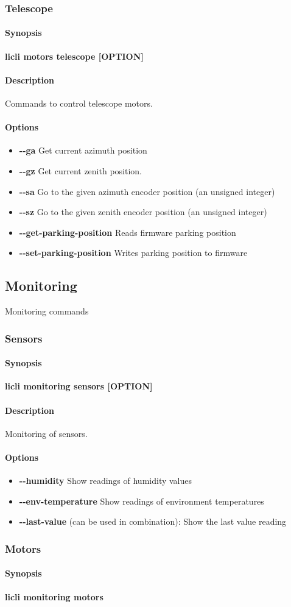 \documentclass[letterpaper, 10 pt]{article}
\newcommand{\cmdsection}[1]{\paragraph{#1}\mbox{}\par}
\begin{document}
\subsubsection{Telescope}
\cmdsection{Synopsis} \textbf{licli motors telescope [OPTION]}\\

\cmdsection{Description} Commands to control telescope motors. \\
\cmdsection{Options}
\begin{itemize}
	\item[] \textbf{-{}-ga} Get current azimuth position
	\item[] \textbf{-{}-gz} Get current zenith position.
	\item[] \textbf{-{}-sa} Go to the given azimuth encoder position (an unsigned integer)
	\item[] \textbf{-{}-sz} Go to the given zenith encoder position (an unsigned integer)
	\item[] \textbf{-{}-get-parking-position} Reads firmware parking position
	\item[] \textbf{-{}-set-parking-position} Writes parking position to firmware
\end{itemize}
\subsection{Monitoring}
Monitoring commands
\subsubsection{Sensors}
\cmdsection{Synopsis} \textbf{licli monitoring sensors [OPTION]}\\

\cmdsection{Description} Monitoring of sensors.\\
\cmdsection{Options}
\begin{itemize}
	\item[] \textbf{-{}-humidity} Show readings of humidity values 
	\item[] \textbf{-{}-env-temperature} Show readings of environment temperatures
	\item[] \textbf{-{}-last-value} (can be used in combination): Show the last value reading
\end{itemize}
\subsubsection{Motors}
\cmdsection{Synopsis} \textbf{licli monitoring motors}\\
\end{document}
